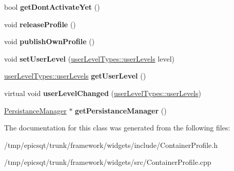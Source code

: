 \begin{DoxyCompactItemize}
\item 
\hypertarget{classContainerProfile_a5a22ff4bcda3678dc369982145c3988f}{
bool {\bfseries getDontActivateYet} ()}
\label{classContainerProfile_a5a22ff4bcda3678dc369982145c3988f}

\item 
\hypertarget{classContainerProfile_af7f96acecf83683e3a840221bfce0a71}{
void {\bfseries releaseProfile} ()}
\label{classContainerProfile_af7f96acecf83683e3a840221bfce0a71}

\item 
\hypertarget{classContainerProfile_a5aa04fe4fe8dcfc1d64fdf8345d54c06}{
void {\bfseries publishOwnProfile} ()}
\label{classContainerProfile_a5aa04fe4fe8dcfc1d64fdf8345d54c06}

\item 
\hypertarget{classContainerProfile_a1c5c3cf59b4e1d82ed7a87b473aa173d}{
void {\bfseries setUserLevel} (\hyperlink{classuserLevelTypes_a033cf2a40f620286b1839dd360c8497b}{userLevelTypes::userLevels} level)}
\label{classContainerProfile_a1c5c3cf59b4e1d82ed7a87b473aa173d}

\item 
\hypertarget{classContainerProfile_a97b20c056e2b243fcdebb4201eea9fee}{
\hyperlink{classuserLevelTypes_a033cf2a40f620286b1839dd360c8497b}{userLevelTypes::userLevels} {\bfseries getUserLevel} ()}
\label{classContainerProfile_a97b20c056e2b243fcdebb4201eea9fee}

\item 
\hypertarget{classContainerProfile_a9ec303b7781d01b9c1ee20fa149ce48d}{
virtual void {\bfseries userLevelChanged} (\hyperlink{classuserLevelTypes_a033cf2a40f620286b1839dd360c8497b}{userLevelTypes::userLevels})}
\label{classContainerProfile_a9ec303b7781d01b9c1ee20fa149ce48d}

\item 
\hypertarget{classContainerProfile_a7699b1fa0bf2b680562a1bf05f5e4c9a}{
\hyperlink{classPersistanceManager}{PersistanceManager} $\ast$ {\bfseries getPersistanceManager} ()}
\label{classContainerProfile_a7699b1fa0bf2b680562a1bf05f5e4c9a}

\end{DoxyCompactItemize}


The documentation for this class was generated from the following files:\begin{DoxyCompactItemize}
\item 
/tmp/epicsqt/trunk/framework/widgets/include/ContainerProfile.h\item 
/tmp/epicsqt/trunk/framework/widgets/src/ContainerProfile.cpp\end{DoxyCompactItemize}
